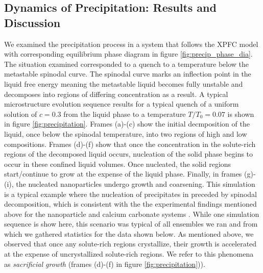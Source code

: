 \documentclass[showkeys, prb, reprint]{revtex4-1}
\begin{document}
\subsection{Dynamics of Precipitation: Results and Discussion} %

 
We examined the precipitation process in a system that follows the XPFC model
with corresponding equilibrium phase diagram in figure
\ref{fig:precip_phase_dia}. The situation examined corresponded to a quench to
a temperature below the metastable spinodal curve. The spinodal curve marks an
inflection point in the liquid free energy meaning the metastable liquid
becomes fully unstable and decomposes into regions of differing concentration
as a result. A typical microstructure evolution sequence results for a typical
quench of a uniform solution of $c = 0.3$ from the liquid phase to a
temperature $T/T_0 = 0.07$ is shown in figure \ref{fig:precipitation}.
Frames (a)-(c) show the initial decmposition of the liquid, once below the
spinodal temperature, into two regions of high and low compositions. Frames
(d)-(f) show that once the concentration in the solute-rich regions of the
decomposed liquid occurs, nucleation of the solid phase begins to occur in
these confined liquid volumes. Once nucleated, the solid regions start/continue
to grow at the expense of the liquid phase. Finally, in frames (g)-(i), the
nucleated nanoparticles undergo growth and coarsening. This simulation is a
typical example where the nucleation of precipitates in preceded by spinodal
decomposition, which is consistent with the  the experimental findings
mentioned above for the nanoparticle and calcium carbonate systems \cite{LOH17,
WALLACE13}. While one simulation sequence is show here, this scenario was
typical of all ensembles we ran and from which we gathered statistics for the
data shown below. As mentioned above, we observed that once any solute-rich
regions crystallize, their growth is accelerated at the expense of
uncrystallized solute-rich regions. We refer to this phenomena as
\textit{sacrificial growth} (frames (d)-(f) in figure
\ref{fig:precipitation})). 
%
\end{document}

